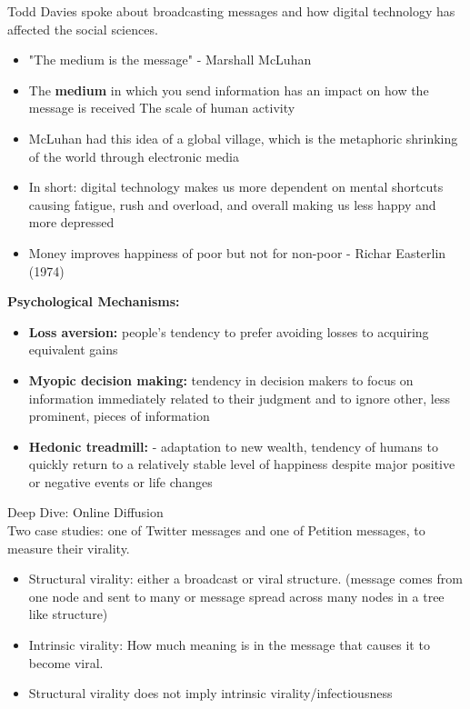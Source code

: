 \documentclass{article}
\begin{document}
Todd Davies spoke about broadcasting messages and how digital technology has affected the social sciences. \\ 

\begin{itemize}
    \item "The medium is the message" - Marshall McLuhan
    \item The \textbf{medium} in which you send information has an impact on how the message is received
        \subitem The scale of human activity
    \item McLuhan had this idea of a global village, which is the metaphoric shrinking of the world through electronic media 
    \item In short: digital technology makes us more dependent on mental shortcuts causing fatigue, rush and overload, and overall making us less happy and more depressed
    \item Money improves happiness of poor but not for non-poor - Richar Easterlin (1974) 
\end{itemize}

\noindent \textbf{Psychological Mechanisms:}
\begin{itemize}
    \item \textbf{Loss aversion:} people's tendency to prefer avoiding losses to acquiring equivalent gains
    \item \textbf{Myopic decision making:} tendency in decision makers to focus on information immediately related to their judgment and to ignore other, less prominent, pieces of information 
    \item \textbf{Hedonic treadmill:} - adaptation to new wealth, tendency of humans to quickly return to a relatively stable level of happiness despite major positive or negative events or life changes
\end{itemize}

\noindent Deep Dive: Online Diffusion \\
Two case studies: one of Twitter messages and one of Petition messages, to measure their virality. 

\begin{itemize}
    \item Structural virality: either a broadcast or viral structure. (message comes from one node and sent to many or message spread across many nodes in a tree like structure) 
    \item Intrinsic virality: How much meaning is in the message that causes it to become viral. 
    \item Structural virality does not imply intrinsic virality/infectiousness
\end{itemize}
\end{document}
